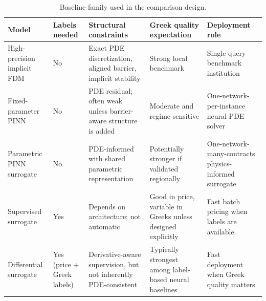 \begin{table}
\caption{Baseline family used in the comparison design.}
\label{tab:baseline_family}
\begin{tabular}{lllll}
\toprule
Model & Labels needed & Structural constraints & Greek quality expectation & Deployment role \\
\midrule
High-precision implicit FDM & No & Exact PDE discretization, aligned barrier, implicit stability & Strong local benchmark & Single-query benchmark institution \\
Fixed-parameter PINN & No & PDE residual; often weak unless barrier-aware structure is added & Moderate and regime-sensitive & One-network-per-instance neural PDE solver \\
Parametric PINN surrogate & No & PDE-informed with shared parametric representation & Potentially stronger if validated regionally & One-network-many-contracts physics-informed surrogate \\
Supervised surrogate & Yes & Depends on architecture; not automatic & Good in price, variable in Greeks unless designed explicitly & Fast batch pricing when labels are available \\
Differential surrogate & Yes (price + Greek labels) & Derivative-aware supervision, but not inherently PDE-consistent & Typically strongest among label-based neural baselines & Fast deployment when Greek quality matters \\
\bottomrule
\end{tabular}
\end{table}
